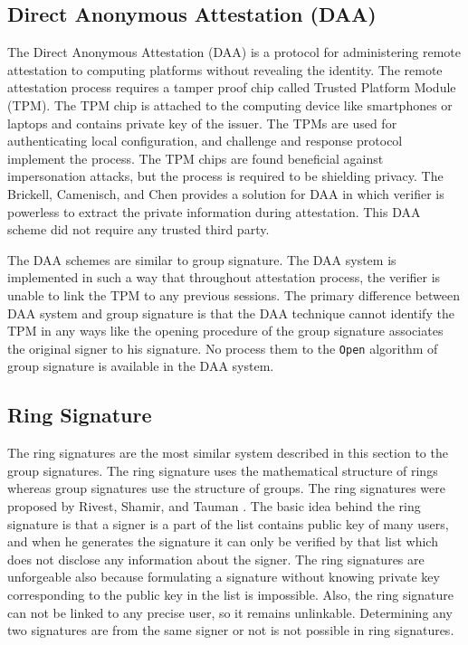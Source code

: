 \subsection{Direct Anonymous Attestation (DAA)}
The Direct Anonymous Attestation (DAA) is a protocol for administering remote attestation to computing platforms without revealing the identity. The remote attestation process requires a tamper proof chip called Trusted Platform Module (TPM). The TPM chip is attached to the computing device like smartphones or laptops and contains private key of the issuer. The TPMs are used for authenticating local configuration, and challenge and response protocol implement the process. The TPM chips are found beneficial against impersonation attacks, but the process is required to be shielding privacy. The Brickell, Camenisch, and Chen \cite{brickell2004direct} provides a solution for DAA in which verifier is powerless to extract the private information during attestation. This DAA scheme did not require any trusted third party.

The DAA schemes are similar to group signature. The DAA system is implemented in such a way that throughout attestation process, the verifier is unable to link the TPM to any previous sessions. The primary difference between DAA system and group signature is that the DAA technique cannot identify the TPM in any ways like the opening procedure of the group signature associates the original signer to his signature. No process them to the \texttt{Open} algorithm of group signature is available in the DAA system.

\subsection{Ring Signature}
The ring signatures are the most similar system described in this section to the group signatures. The ring signature uses the mathematical structure of rings whereas group signatures use the structure of groups. The ring signatures were proposed by Rivest, Shamir, and Tauman \cite{rivest2001leak}. The basic idea behind the ring signature is that a signer is a part of the list contains public key of many users, and when he generates the signature it can only be verified by that list which does not disclose any information about the signer. The ring signatures are unforgeable also because formulating a signature without knowing private key corresponding to the public key in the list is impossible. Also, the ring signature can not be linked to any precise user, so it remains unlinkable. Determining any two signatures are from the same signer or not is not possible in ring signatures. 

